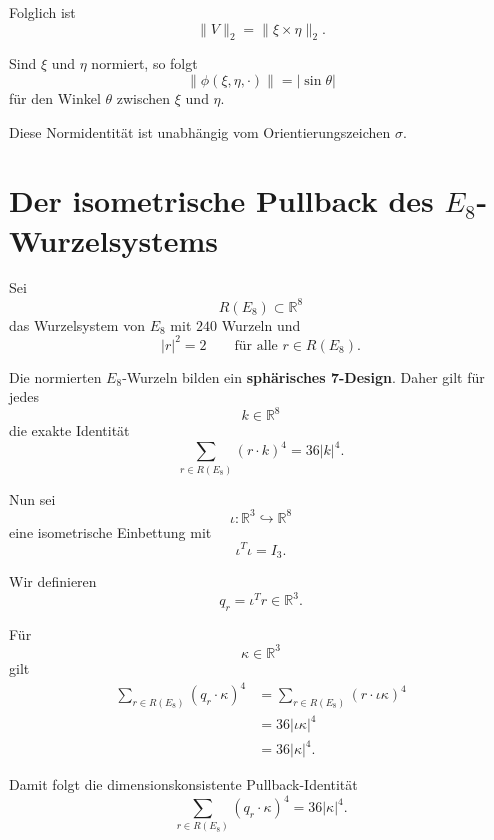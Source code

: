 \documentclass[11pt,twoside,a4paper]{article}
\begin{document}
	Folglich ist
	\begin{equation}
		\|V\|_2
		=
		\|\xi\times\eta\|_2.
	\end{equation}
	
	Sind $\xi$ und $\eta$ normiert, so folgt
	\begin{equation}
		\boxed{
			\|\phi(\xi,\eta,\cdot)\|
			=
			|\sin\theta|
		}
	\end{equation}
	für den Winkel $\theta$ zwischen $\xi$ und $\eta$.
	
	Diese Normidentität ist unabhängig vom Orientierungszeichen $\sigma$.
	
	\section{Der isometrische Pullback des $E_8$-Wurzelsystems}
	
	Sei
	\[
	R(E_8)\subset\mathbb{R}^8
	\]
	das Wurzelsystem von $E_8$ mit $240$ Wurzeln und
	\[
	|r|^2=2
	\qquad
	\text{für alle }r\in R(E_8).
	\]
	
	Die normierten $E_8$-Wurzeln bilden ein \textbf{sphärisches 7-Design}. Daher gilt für jedes
	\[
	k\in\mathbb{R}^8
	\]
	die exakte Identität
	\begin{equation}
		\boxed{
			\sum_{r\in R(E_8)}
			(r\cdot k)^4
			=
			36|k|^4.
		}
	\end{equation}
	
	Nun sei
	\begin{equation}
		\iota:
		\mathbb{R}^3
		\hookrightarrow
		\mathbb{R}^8
	\end{equation}
	eine isometrische Einbettung mit
	\begin{equation}
		\iota^T\iota
		=
		I_3.
	\end{equation}
	
	Wir definieren
	\begin{equation}
		q_r
		=
		\iota^Tr
		\in
		\mathbb{R}^3.
	\end{equation}
	
	Für
	\[
	\kappa\in\mathbb{R}^3
	\]
	gilt
	\begin{align}
		\sum_{r\in R(E_8)}
		(q_r\cdot\kappa)^4
		&=
		\sum_{r\in R(E_8)}
		(r\cdot\iota\kappa)^4
		\\
		&=
		36|\iota\kappa|^4
		\\
		&=
		36|\kappa|^4.
	\end{align}
	
	Damit folgt die dimensionskonsistente Pullback-Identität
	\begin{equation}
		\boxed{
			\sum_{r\in R(E_8)}
			(q_r\cdot\kappa)^4
			=
			36|\kappa|^4.
		}
	\end{equation}
	
\end{document}
